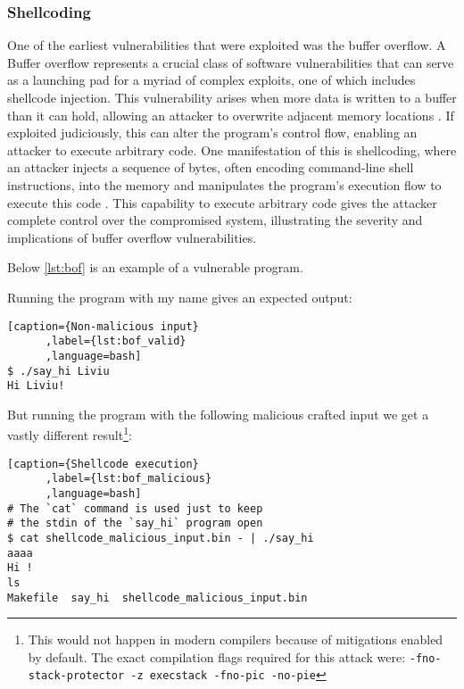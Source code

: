 \documentclass{article}
\begin{document}
\subsubsection{Shellcoding}
\begin{comment}
  shellcoding
  reference smashing the stack for fun and profit
\end{comment}
One of the earliest vulnerabilities that were exploited was the buffer overflow. A Buffer overflow represents a crucial class of software vulnerabilities that can serve as a launching pad for a myriad of complex exploits, one of which includes shellcode injection. This vulnerability arises when more data is written to a buffer than it can hold, allowing an attacker to overwrite adjacent memory locations \cite{seacord2013}. If exploited judiciously, this can alter the program's control flow, enabling an attacker to execute arbitrary code. One manifestation of this is shellcoding, where an attacker injects a sequence of bytes, often encoding command-line shell instructions, into the memory and manipulates the program's execution flow to execute this code \cite{one1996smashing}. This capability to execute arbitrary code gives the attacker complete control over the compromised system, illustrating the severity and implications of buffer overflow vulnerabilities.

Below \ref{lst:bof} is an example of a vulnerable program.

Running the program with my name gives an expected output:
\begin{lstlisting}[caption={Non-malicious input}
      ,label={lst:bof_valid}
      ,language=bash]
$ ./say_hi Liviu
Hi Liviu!
\end{lstlisting}

But running the program with the following malicious crafted input we get a vastly different result\footnote{This would not happen in modern compilers because of mitigations enabled by default. The exact compilation flags required for this attack were: \texttt{-fno-stack-protector -z execstack -fno-pic -no-pie}}:
\begin{lstlisting}[caption={Shellcode execution}
      ,label={lst:bof_malicious}
      ,language=bash]
# The `cat` command is used just to keep
# the stdin of the `say_hi` program open
$ cat shellcode_malicious_input.bin - | ./say_hi
aaaa
Hi !
ls
Makefile  say_hi  shellcode_malicious_input.bin
\end{lstlisting}
\end{document}
